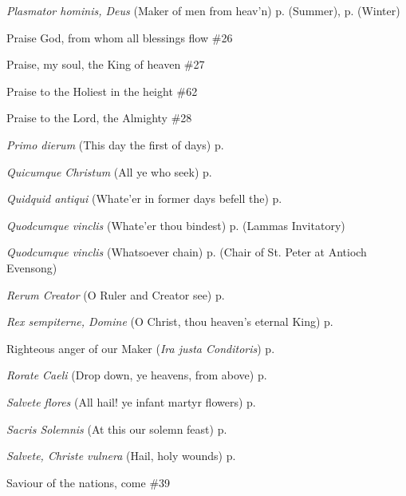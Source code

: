 \begin{hangparas}{1.25em}{1}
\textit{Plasmator hominis, Deus} (Maker of men from heav'n) \dotfill p. \pageref{FridayEvensongSummer} (Summer), p. \pageref{FridayEvensongWinter} (Winter)
\par\noindent
Praise God, from whom all blessings flow \dotfill \#26
\par\noindent
Praise, my soul, the King of heaven \dotfill \#27
\par\noindent
Praise to the Holiest in the height \dotfill \#62
\par\noindent
Praise to the Lord, the Almighty \dotfill \#28
\par\noindent
\textit{Primo dierum} (This day the first of days) \dotfill p. \pageref{SundayInvitatoryWinter}
\par\noindent
\textit{Quicumque Christum} (All ye who seek) \dotfill p. \pageref{TransfigurationEvensong}
\par\noindent
\textit{Quidquid antiqui} (Whate'er in former days befell the) \dotfill p. \pageref{BenedictInvitatory}
\par\noindent
\textit{Quodcumque vinclis} (Whate'er thou bindest) \dotfill p. \pageref{LammasInvitatory} (Lammas Invitatory)
\par\noindent
\textit{Quodcumque vinclis} (Whatsoever chain) \dotfill p. \pageref{PeterAntiochEvensong} (Chair of St. Peter at Antioch Evensong)
\par\noindent
\textit{Rerum Creator} (O Ruler and Creator see) \dotfill p. \pageref{WednesdayInvitatory}
\par\noindent
\textit{Rex sempiterne, Domine} (O Christ, thou heaven's eternal King) \dotfill p. \pageref{EasterInvitatory}
\par\noindent
Righteous anger of our Maker (\textit{Ira justa Conditoris}) \dotfill p. \pageref{PreciousBloodInvitatory}
\par\noindent
\textit{Rorate Caeli} (Drop down, ye heavens, from above) \dotfill p. \pageref{AdventProse}
\par\noindent
\textit{Salvete flores} (All hail! ye infant martyr flowers) \dotfill p. \pageref{HolyInnocentsMattins}
\par\noindent
\textit{Sacris Solemnis} (At this our solemn feast) \dotfill p. \pageref{CorpusChristiInvitatory}
\par\noindent
\textit{Salvete, Christe vulnera} (Hail, holy wounds) \dotfill p. \pageref{PreciousBloodMattins}
\par\noindent
Saviour of the nations, come \dotfill \#39
\par\noindent

\end{hangparas}
